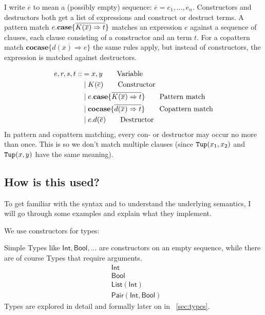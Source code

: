\documentclass[twoside,12pt,a4paper]{article}
\begin{document}
I write $\overline{e}$ to mean a (possibly empty) sequence: $\overline{e}= e_1, ..., e_n$.  
Constructors and destructors both get a list of expressions and construct or destruct terms.
A pattern match $e.\textbf{case}\{\overline{K(\overline{x})\Rightarrow t}\}$ matches an expression $e$ against a sequence of clauses, each clause consisting of a constructor and an term $t$.
For a copattern match $\textbf{cocase} \{\overline{d(\overline{x}) \Rightarrow e}\}$
the same rules apply, but instead of constructors, the expression is matched against destructors.

\begin{definition}
    \begin{align*}
    e,r,s,t ::&=  x,y  \tag*{Variable} \\
        &\;|\;K(\overline{e}) \tag*{Constructor} \\
        &\;|\;e.\textbf{case}\{\overline{K(\overline{x})\Rightarrow t}\}  \tag*{Pattern match}\\
        &\;|\;\textbf{cocase}\{\overline{d(\overline{x})\Rightarrow t}\}  \tag*{Copattern match}\\
        &\;|\;e.d(\overline{e})  \tag*{Destructor}
    \end{align*}
    In pattern and copattern matching, every con- or destructor may occur no more than once.
    This is so we don't match multiple clauses (since $\mathtt{Tup(}x_1, x_2\mathtt{)}$ and $\mathtt{Tup(}x, y\mathtt{)}$ have the same meaning). %
\end{definition}
\iffalse$x, y \in$ \textsc{Var}, $\constructor \in$\textsc{CtorDtorName} $\lor$ \textsc{TypeName}, $\destructor \in$\textsc{CtorDtorName}.
\fi %
\subsection{How is this used?}

To get familiar with the syntax and to understand the underlying semantics, I will go through some examples and explain what they implement.

We use constructors for types:
\begin{example}
    Simple Types like $\mathsf{Int, Bool, ...}$ are constructors on an empty sequence, 
    while there are of course Types that require arguments. %
    \begin{align*}
        &\mathsf{Int}\tag{1}\\
        &\mathsf{Bool}\tag{2}\\
        &\mathsf{List(Int)}\tag{3}\\
        &\mathsf{Pair(Int, Bool)}\tag{4}
    \end{align*}
    Types are explored in detail and formally later on in ~\ref{sec:types}.
\end{example}
\end{document}
